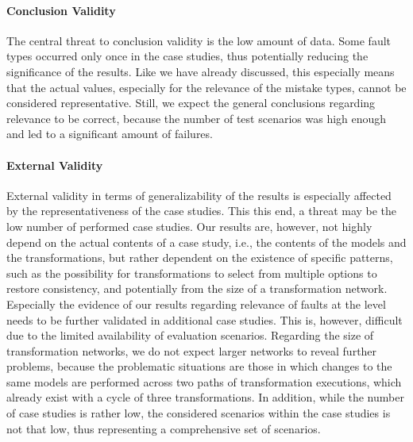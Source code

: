 \paragraph{Conclusion Validity}
The central threat to conclusion validity is the low amount of data.
Some fault types occurred only once in the case studies, thus potentially reducing the significance of the results.
Like we have already discussed, this especially means that the actual values, especially for the relevance of the mistake types, cannot be considered representative.
Still, we expect the general conclusions regarding relevance to be correct, because the number of test scenarios was high enough and led to a significant amount of failures.



\paragraph{External Validity}
\label{chap:correctness_evaluation:categorization:discussion:limitations}

External validity in terms of generalizability of the results is especially affected by the representativeness of the case studies.
This this end, a threat may be the low number of performed case studies.
Our results are, however, not highly depend on the actual contents of a case study, i.e., the contents of the models and the transformations, but rather dependent on the existence of specific patterns, such as the possibility for transformations to select from multiple options to restore consistency, and potentially from the size of a transformation network.
Especially the evidence of our results regarding relevance of faults at the \levelnetworkrule level needs to be further validated in additional case studies.
This is, however, difficult due to the limited availability of evaluation scenarios.
Regarding the size of transformation networks, we do not expect larger networks to reveal further problems, because the problematic situations are those in which changes to the same models are performed across two paths of transformation executions, which already exist with a cycle of three transformations.
In addition, while the number of case studies is rather low, the considered scenarios within the case studies is not that low, thus representing a comprehensive set of scenarios.

